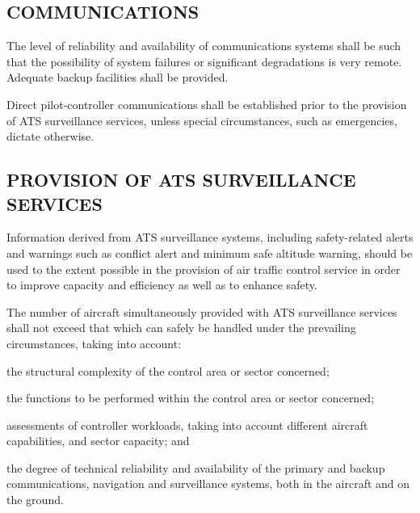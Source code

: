 \subsection[Communications]{COMMUNICATIONS}

\begin{enumnoss}
    \item The level of reliability and availability of communications systems shall be such that the possibility of system failures or significant degradations is very remote. Adequate backup facilities shall be provided.
    \item Direct pilot-controller communications shall be established prior to the provision of ATS surveillance services, unless special circumstances, such as emergencies, dictate otherwise.
\end{enumnoss}

\subsection[Provision of ATS surveillance services]{PROVISION OF ATS SURVEILLANCE SERVICES}

\begin{enumnoss}
    \item Information derived from ATS surveillance systems, including safety-related alerts and warnings such as conflict alert and minimum safe altitude warning, should be used to the extent possible in the provision of air traffic control service in order to improve capacity and efficiency as well as to enhance safety.
    \item The number of aircraft simultaneously provided with ATS surveillance services shall not exceed that which can safely be handled under the prevailing circumstances, taking into account:

    \begin{enumalph}
        \item the structural complexity of the control area or sector concerned;
        \item the functions to be performed within the control area or sector concerned;
        \item assessments of controller workloads, taking into account different aircraft capabilities, and sector capacity; and
        \item the degree of technical reliability and availability of the primary and backup communications, navigation and surveillance systems, both in the aircraft and on the ground.
    \end{enumalph}
\end{enumnoss}

